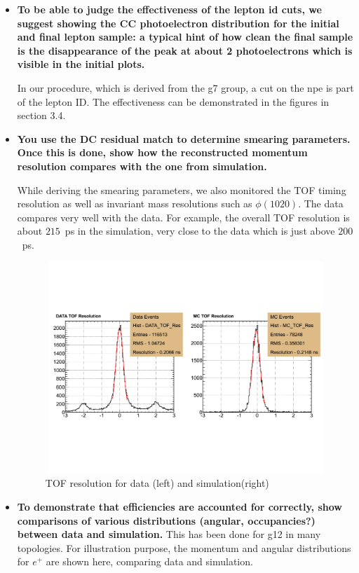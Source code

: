 \documentclass[ 12 pt]{article}
\begin{document}
\begin{itemize}
\item \textbf{To be able to judge the effectiveness of the lepton id cuts, we suggest
showing the CC photoelectron distribution for the initial and final lepton
sample: a typical hint of how clean the final sample is the disappearance of
the peak at about 2 photoelectrons which is visible in the initial plots.}

In our procedure, which is derived from the g7 group, a cut on the npe is part of the lepton ID. The effectiveness can be demonstrated in the figures in section 3.4. 




\item \textbf{You use the DC residual match to determine smearing parameters. Once this 
is done, show how the reconstructed momentum resolution compares with 
the one from simulation.}

While deriving the smearing parameters, we also monitored the TOF timing resolution as well as invariant mass resolutions such as $\phi(1020)$. The data compares very well with the data. For example, the overall TOF resolution is about $215$~ps in the simulation, very close to the data which is just above $200$~ps.

\begin{figure}[h!]\begin{center}
\includegraphics[width=12cm,height=8cm]{figures/calib/tof/TOF_gpp.pdf}
\caption[]{ TOF resolution for data (left) and simulation(right)}
\end{center}\end{figure}

\item \textbf{To demonstrate that efficiencies are accounted for correctly, show
comparisons of various distributions (angular, occupancies?) between data
and simulation.}
This has been done for g12 in many topologies. For illustration purpose, the momentum and angular distributions for $e^+$ are shown here, comparing data and simulation. 


\end{itemize}
\end{document}

